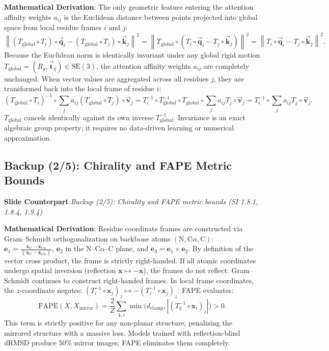 \documentclass[10pt,a4paper]{article}
\newcommand{\SE}{\mathrm{SE}(3)}
\newcommand{\vt}{\vec{\bm{t}}}
\newcommand{\vq}{\vec{\bm{q}}}
\newcommand{\vk}{\vec{\bm{k}}}
\newcommand{\vval}{\vec{\bm{v}}}
\newcommand{\Tg}{T_{\text{global}}}
\begin{document}
\textbf{Mathematical Derivation}:
The only geometric feature entering the attention affinity weights $a_{ij}$ is the Euclidean distance between points projected into global space from local residue frames $i$ and $j$:
\begin{equation}
\left\| (\Tg \circ T_i) \circ \vq_i - (\Tg \circ T_j) \circ \vk_j \right\|^2 = \left\| \Tg \circ (T_i \circ \vq_i - T_j \circ \vk_j) \right\|^2 = \left\| T_i \circ \vq_i - T_j \circ \vk_j \right\|^2.
\end{equation}
Because the Euclidean norm is identically invariant under any global rigid motion $\Tg = (R_g, \vt_g) \in \SE$, the attention affinity weights $a_{ij}$ are completely unchanged. When vector values are aggregated across all residues $j$, they are transformed back into the local frame of residue $i$:
\begin{equation}
(\Tg \circ T_i)^{-1} \circ \sum_j a_{ij} (\Tg \circ T_j) \circ \vval_j = T_i^{-1} \circ \Tg^{-1} \circ \Tg \circ \sum_j a_{ij} T_j \circ \vval_j = T_i^{-1} \circ \sum_j a_{ij} T_j \circ \vval_j.
\end{equation}
$\Tg$ cancels identically against its own inverse $\Tg^{-1}$. Invariance is an exact algebraic group property; it requires no data-driven learning or numerical approximation.

\subsection{Backup (2/5): Chirality and FAPE Metric Bounds}
\textbf{Slide Counterpart}:\enspace \textsl{Backup (2/5): Chirality and FAPE metric bounds (SI 1.8.1, 1.8.4, 1.9.4)}

\textbf{Mathematical Derivation}:
Residue coordinate frames are constructed via Gram--Schmidt orthogonalization on backbone atoms $(\mathrm{N}, \mathrm{C}\alpha, \mathrm{C})$:
$\bm{e}_1 = \frac{\bm{x}_{\mathrm{C}} - \bm{x}_{\mathrm{C}\alpha}}{\|\bm{x}_{\mathrm{C}} - \bm{x}_{\mathrm{C}\alpha}\|}$, $\bm{e}_2$ in the $\mathrm{N}$--$\mathrm{C}\alpha$--$\mathrm{C}$ plane, and $\bm{e}_3 = \bm{e}_1 \times \bm{e}_2$. 
By definition of the vector cross product, the frame is strictly right-handed. 
If all atomic coordinates undergo spatial inversion (reflection $\bm{x} \mapsto -\bm{x}$), the frames do not reflect: Gram--Schmidt continues to construct right-handed frames. In local frame coordinates, the $z$-coordinate negates: $(T_i^{-1} \circ \bm{x}_j)_z \mapsto -(T_i^{-1} \circ \bm{x}_j)_z$. 
FAPE evaluates:
\begin{equation}
\mathrm{FAPE}(X, X_{\text{mirror}}) = \frac{2}{Z}\sum_{k,i} \min\big(d_{\text{clamp}}, |(T_k^{-1} \circ \bm{x}_i)_z|\big) > 0.
\end{equation}
This term is strictly positive for any non-planar structure, penalizing the mirrored structure with a massive loss. Models trained with reflection-blind dRMSD produce 50\% mirror images; FAPE eliminates them completely.
\end{document}
